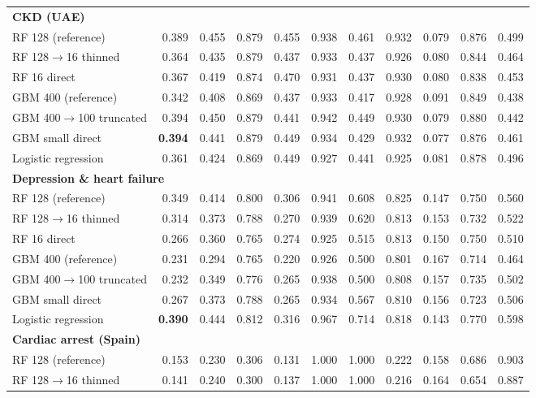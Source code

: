 {\begin{longtable}{lrrrrrrrrrr}
\midrule
\multicolumn{11}{l}{\textbf{CKD (UAE)}} \\*
\quad RF 128 (reference) & 0.389 & 0.455 & 0.879 & 0.455 & 0.938 & 0.461 & 0.932 & 0.079 & 0.876 & 0.499 \\
\quad RF 128$\rightarrow$16 thinned & 0.364 & 0.435 & 0.879 & 0.437 & 0.933 & 0.437 & 0.926 & 0.080 & 0.844 & 0.464 \\
\quad RF 16 direct & 0.367 & 0.419 & 0.874 & 0.470 & 0.931 & 0.437 & 0.930 & 0.080 & 0.838 & 0.453 \\
\quad GBM 400 (reference) & 0.342 & 0.408 & 0.869 & 0.437 & 0.933 & 0.417 & 0.928 & 0.091 & 0.849 & 0.438 \\
\quad GBM 400$\rightarrow$100 truncated & 0.394 & 0.450 & 0.879 & 0.441 & 0.942 & 0.449 & 0.930 & 0.079 & 0.880 & 0.442 \\
\quad GBM small direct & \textbf{0.394} & 0.441 & 0.879 & 0.449 & 0.934 & 0.429 & 0.932 & 0.077 & 0.876 & 0.461 \\
\quad Logistic regression & 0.361 & 0.424 & 0.869 & 0.449 & 0.927 & 0.441 & 0.925 & 0.081 & 0.878 & 0.496 \\
\midrule
\multicolumn{11}{l}{\textbf{Depression \& heart failure}} \\*
\quad RF 128 (reference) & 0.349 & 0.414 & 0.800 & 0.306 & 0.941 & 0.608 & 0.825 & 0.147 & 0.750 & 0.560 \\
\quad RF 128$\rightarrow$16 thinned & 0.314 & 0.373 & 0.788 & 0.270 & 0.939 & 0.620 & 0.813 & 0.153 & 0.732 & 0.522 \\
\quad RF 16 direct & 0.266 & 0.360 & 0.765 & 0.274 & 0.925 & 0.515 & 0.813 & 0.150 & 0.750 & 0.510 \\
\quad GBM 400 (reference) & 0.231 & 0.294 & 0.765 & 0.220 & 0.926 & 0.500 & 0.801 & 0.167 & 0.714 & 0.464 \\
\quad GBM 400$\rightarrow$100 truncated & 0.232 & 0.349 & 0.776 & 0.265 & 0.938 & 0.500 & 0.808 & 0.157 & 0.735 & 0.502 \\
\quad GBM small direct & 0.267 & 0.373 & 0.788 & 0.265 & 0.934 & 0.567 & 0.810 & 0.156 & 0.723 & 0.506 \\
\quad Logistic regression & \textbf{0.390} & 0.444 & 0.812 & 0.316 & 0.967 & 0.714 & 0.818 & 0.143 & 0.770 & 0.598 \\
\midrule
\multicolumn{11}{l}{\textbf{Cardiac arrest (Spain)}} \\*
\quad RF 128 (reference) & 0.153 & 0.230 & 0.306 & 0.131 & 1.000 & 1.000 & 0.222 & 0.158 & 0.686 & 0.903 \\
\quad RF 128$\rightarrow$16 thinned & 0.141 & 0.240 & 0.300 & 0.137 & 1.000 & 1.000 & 0.216 & 0.164 & 0.654 & 0.887 \\

\end{longtable}}
